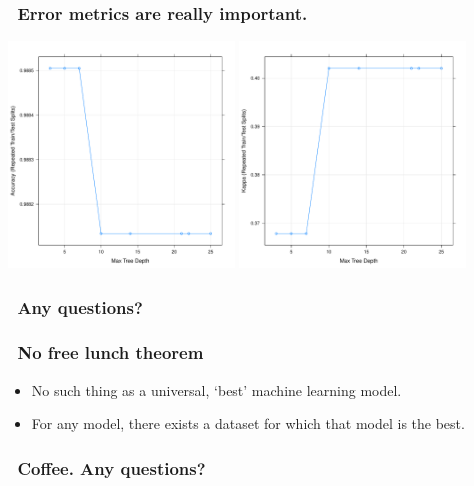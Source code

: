\documentclass[handout, aspectratio = 169]{beamer}
\begin{document}
\begin{frame}
\frametitle{\insertframenumber~Error metrics are really important.}

    \includegraphics[width = 0.45\textwidth]{rpart_acc.pdf}%
    \includegraphics[width = 0.45\textwidth]{rpart_kappa.pdf}

\end{frame} 


\begin{frame}
\frametitle{\insertframenumber~Any questions?}


\end{frame} 



\begin{frame}
\frametitle{\insertframenumber~No free lunch theorem}
\begin{itemize}
\item No such thing as a universal, `best' machine learning model.
\item For any model, there exists a dataset for which that model is the best.
\end{itemize}

\end{frame} 


\begin{frame}
\frametitle{\insertframenumber~Coffee. Any questions?}


\end{frame} 
\end{document}
